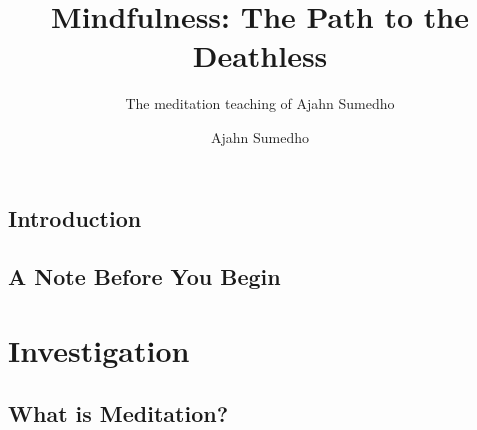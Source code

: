 \documentclass[11pt,twoside,final]{memoir}
\title{Mindfulness: The Path to the Deathless}
\subtitle{The meditation teaching of Ajahn Sumedho}
\author{Ajahn Sumedho}
\date{}
\begin{document}
\emptysheet


\frontmatter*
\midsloppy


\cleartorecto
\thispagestyle{empty}



\cleartoverso
\thispagestyle{empty}



\cleartorecto
\thispagestyle{empty}



\cleartorecto
\tableofcontents*



\chapter{Introduction}



\mainmatter*

\book*{\thetitle}

\setcounter{chapter}{0}


\chapter{A Note Before You Begin}


\part{Investigation}

\chapter{What is Meditation?}

\end{document}
